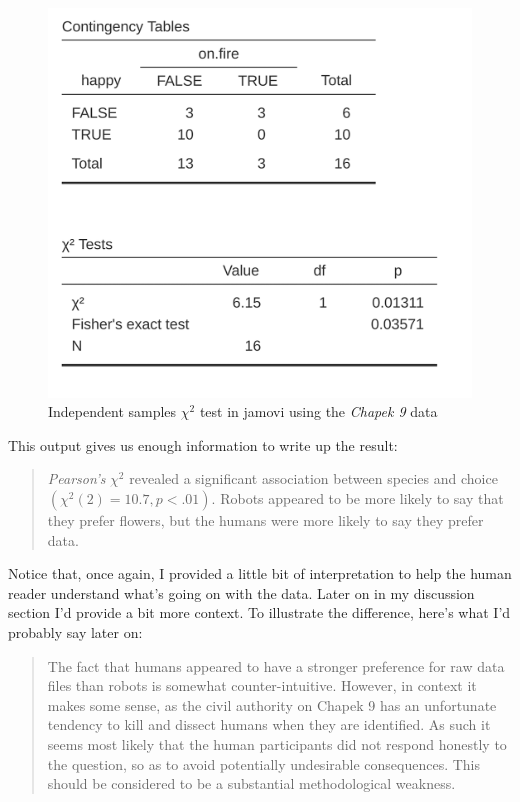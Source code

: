 \documentclass[
  a4paper,
]{book}
\begin{document}
\begin{figure}

\includegraphics[width=1\textwidth,height=\textheight]{images/fig10-6.png} \hfill{}

\caption{\label{fig-fig10-6}Independent samples \(\chi^2\) test in
jamovi using the \emph{Chapek 9} data}

\end{figure}

This output gives us enough information to write up the result:

\begin{quote}
\emph{Pearson's} \(\chi^2\) revealed a significant association between
species and choice \((\chi^2(2) = 10.7, p< .01)\). Robots appeared to be
more likely to say that they prefer flowers, but the humans were more
likely to say they prefer data.
\end{quote}

Notice that, once again, I provided a little bit of interpretation to
help the human reader understand what's going on with the data. Later on
in my discussion section I'd provide a bit more context. To illustrate
the difference, here's what I'd probably say later on:

\begin{quote}
The fact that humans appeared to have a stronger preference for raw data
files than robots is somewhat counter-intuitive. However, in context it
makes some sense, as the civil authority on Chapek 9 has an unfortunate
tendency to kill and dissect humans when they are identified. As such it
seems most likely that the human participants did not respond honestly
to the question, so as to avoid potentially undesirable consequences.
This should be considered to be a substantial methodological weakness.
\end{quote}
\end{document}
